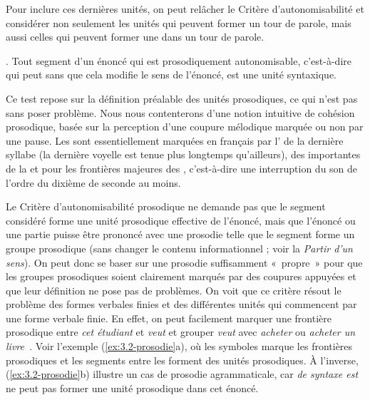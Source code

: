 Pour inclure ces dernières unités, on peut relâcher le Critère d’autonomisabilité et considérer non seulement les unités qui peuvent former un tour de parole, mais aussi celles qui peuvent former une  dans un tour de parole.

{. Tout segment d’un énoncé qui est prosodiquement autonomisable, c’est-à-dire qui peut  sans que cela modifie le sens de l’énoncé, est une unité syntaxique.}

Ce test repose sur la définition préalable des unités prosodiques, ce qui n’est pas sans poser problème. Nous nous contenterons d’une notion intuitive de cohésion prosodique, basée sur la perception d’une coupure mélodique marquée ou non par une pause. Les  sont essentiellement marquées en français par l’ de la dernière syllabe (la dernière voyelle est tenue plus longtemps qu’ailleurs), des  importantes de la  et pour les frontières majeures des , c’est-à-dire une interruption du son de l’ordre du dixième de seconde au moins.

\begin{sloppypar}
Le Critère d’autonomisabilité prosodique ne demande pas que le segment considéré forme une unité prosodique effective de l’énoncé, mais que l’énoncé ou une partie puisse être prononcé avec une prosodie telle que le segment forme un groupe prosodique (sans changer le contenu informationnel ; voir la  \textit{Partir d’un sens}). On peut donc se baser sur une prosodie suffisamment «~propre~» pour que les groupes prosodiques soient clairement marqués par des coupures appuyées et que leur définition ne pose pas de problèmes. On voit que ce critère résout le problème des formes verbales finies et des différentes unités qui commencent par une forme verbale finie. En effet, on peut facilement marquer une frontière prosodique entre \textit{cet étudiant} et \textit{veut} et grouper \textit{veut} avec \textit{acheter} ou \textit{acheter un livre~}. Voir l'exemple (\ref{ex:3.2-prosodie}a), où les symboles {\textbar} marque les frontières prosodiques et les segments entre les {\textbar} forment des unités prosodiques. À l'inverse, (\ref{ex:3.2-prosodie}b) illustre un cas de prosodie agrammaticale, car \textit{de syntaxe est} ne peut pas former une unité prosodique dans cet énoncé.
\end{sloppypar}

